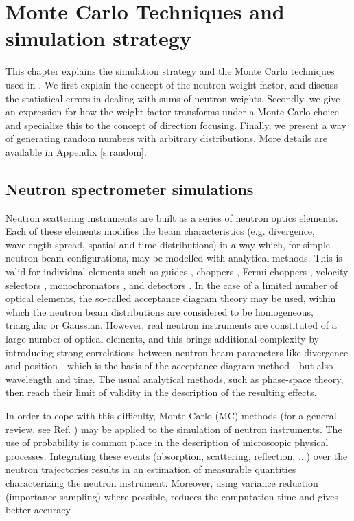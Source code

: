 \chapter{Monte Carlo Techniques and simulation strategy}
\label{s:MCtechniques}

This chapter explains the simulation strategy and the Monte Carlo
techniques used in \MCS. We first explain the concept of the neutron
weight factor, and discuss the statistical errors in dealing with sums
of neutron weights.  Secondly, we give an expression for how the weight
factor transforms under a Monte Carlo choice and specialize this
to the concept of direction focusing.  Finally, we present a way of
generating random numbers with arbitrary distributions.
More details are available in Appendix \ref{s:random}.


\section{Neutron spectrometer simulations}

Neutron scattering instruments are built as a series of neutron optics elements. Each of these elements modifies the beam characteristics (e.g. divergence, wavelength spread, spatial and time distributions) in a way which, for simple neutron beam configurations, may be modelled with analytical methods. This is valid for individual elements such as guides \cite{Leibnitz63,Mildner90}, choppers \cite{Lowde60,Copley03}, Fermi choppers \cite{Fermi47,Peters05}, velocity selectors \cite{Clark66}, monochromators \cite{Freund83,Sears97,Shirane02,Alianelli04}, and detectors \cite{Radeka74,Charpak89,Manzin04}. In the case of a limited number of optical elements, the so-called acceptance diagram theory \cite{Mildner90,Copley93,Cussen03} may be used, within which the neutron beam distributions are considered to be homogeneous, triangular or Gaussian.
However, real neutron instruments are constituted of a large number of optical elements, and this brings additional complexity by introducing strong correlations between neutron beam parameters like divergence and position - which is the basis of the acceptance diagram method - but also wavelength and time. The usual analytical methods, such as phase-space theory, then reach their limit of validity in the description of the resulting effects.

In order to cope with this difficulty, Monte Carlo (MC) methods (for a general review, see Ref. \cite{James80}) may be applied to the simulation of neutron instruments.
The use of probability is common place in the description of microscopic physical processes. Integrating these events (absorption, scattering, reflection, ...) over the neutron trajectories
results in an estimation of measurable quantities characterizing the neutron instrument. Moreover, using variance reduction (importance sampling)
where possible, reduces the computation time and gives better accuracy.

